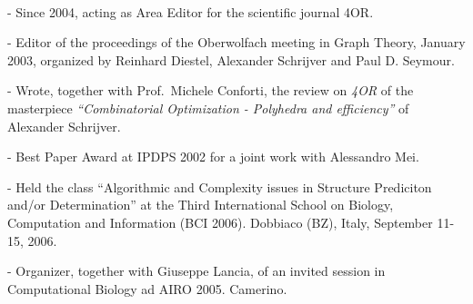 \documentclass[10pt]{article}
\newcommand{\voice}[1] { \bigskip \medskip \noindent {\Large \bf #1} \medskip\\ }
\begin{document}
%
%
%

\voice{{\LARGE Honors}}

   - Since 2004, acting as Area Editor for the scientific journal 4OR.

   - Editor of the proceedings of the Oberwolfach meeting
   in Graph Theory, January 2003,
   organized by Reinhard Diestel, Alexander Schrijver
   and Paul D. Seymour.

   - Wrote, together with Prof.~Michele Conforti,
   the review on {\em 4OR} of the masterpiece
   {\em ``Combinatorial Optimization
              - Polyhedra and efficiency''}
   of Alexander Schrijver.

   - Best Paper Award at IPDPS 2002
     for a joint work with Alessandro Mei.

   - Held the class
    ``Algorithmic and Complexity issues in Structure Prediciton and/or Determination''
     at the Third International School on Biology,
     Computation and Information (BCI 2006).
     Dobbiaco (BZ), Italy, September 11-15, 2006.

   - Organizer, together with Giuseppe Lancia,
     of an invited session in Computational Biology
     ad AIRO 2005. Camerino.
\end{document}
